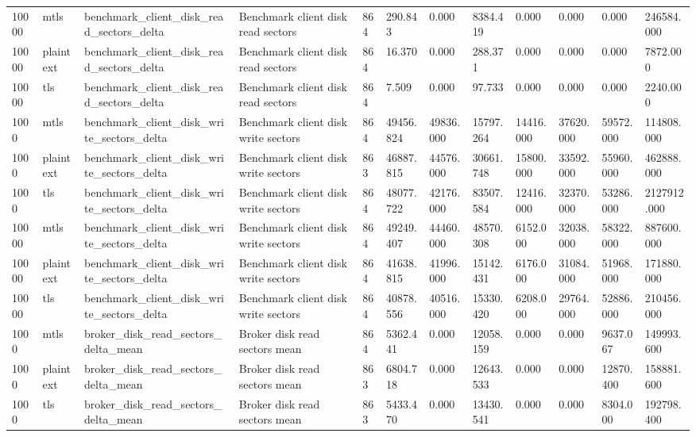 \begin{longtable}{llllllllllll}
10000 & mtls & benchmark\_client\_disk\_read\_sectors\_delta & Benchmark client disk read sectors & 864 & 290.843 & 0.000 & 8384.419 & 0.000 & 0.000 & 0.000 & 246584.000 \\
10000 & plaintext & benchmark\_client\_disk\_read\_sectors\_delta & Benchmark client disk read sectors & 864 & 16.370 & 0.000 & 288.371 & 0.000 & 0.000 & 0.000 & 7872.000 \\
10000 & tls & benchmark\_client\_disk\_read\_sectors\_delta & Benchmark client disk read sectors & 864 & 7.509 & 0.000 & 97.733 & 0.000 & 0.000 & 0.000 & 2240.000 \\
1000 & mtls & benchmark\_client\_disk\_write\_sectors\_delta & Benchmark client disk write sectors & 864 & 49456.824 & 49836.000 & 15797.264 & 14416.000 & 37620.000 & 59572.000 & 114808.000 \\
1000 & plaintext & benchmark\_client\_disk\_write\_sectors\_delta & Benchmark client disk write sectors & 863 & 46887.815 & 44576.000 & 30661.748 & 15800.000 & 33592.000 & 55960.000 & 462888.000 \\
1000 & tls & benchmark\_client\_disk\_write\_sectors\_delta & Benchmark client disk write sectors & 864 & 48077.722 & 42176.000 & 83507.584 & 12416.000 & 32370.000 & 53286.000 & 2127912.000 \\
10000 & mtls & benchmark\_client\_disk\_write\_sectors\_delta & Benchmark client disk write sectors & 864 & 49249.407 & 44460.000 & 48570.308 & 6152.000 & 32038.000 & 58322.000 & 887600.000 \\
10000 & plaintext & benchmark\_client\_disk\_write\_sectors\_delta & Benchmark client disk write sectors & 864 & 41638.815 & 41996.000 & 15142.431 & 6176.000 & 31084.000 & 51968.000 & 171880.000 \\
10000 & tls & benchmark\_client\_disk\_write\_sectors\_delta & Benchmark client disk write sectors & 864 & 40878.556 & 40516.000 & 15330.420 & 6208.000 & 29764.000 & 52886.000 & 210456.000 \\
1000 & mtls & broker\_disk\_read\_sectors\_delta\_mean & Broker disk read sectors mean & 864 & 5362.441 & 0.000 & 12058.159 & 0.000 & 0.000 & 9637.067 & 149993.600 \\
1000 & plaintext & broker\_disk\_read\_sectors\_delta\_mean & Broker disk read sectors mean & 863 & 6804.718 & 0.000 & 12643.533 & 0.000 & 0.000 & 12870.400 & 158881.600 \\
1000 & tls & broker\_disk\_read\_sectors\_delta\_mean & Broker disk read sectors mean & 863 & 5433.470 & 0.000 & 13430.541 & 0.000 & 0.000 & 8304.000 & 192798.400 \\

\end{longtable}
